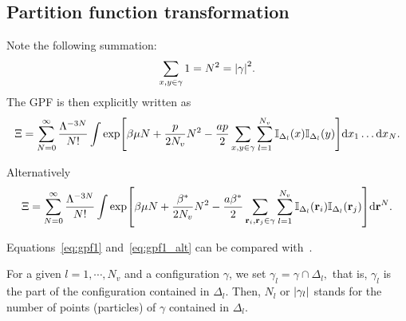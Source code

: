 \documentclass[12pt]{article}
\numberwithin{equation}{section}
\begin{document}
	\subsection{Partition function transformation}
	Note the following summation:
	\begin{equation}
		\sum_{x,y \in \gamma} 1 = N^2 = \abs{\gamma}^2.
	\end{equation}
	The GPF is then explicitly written as
	\begin{equation}
		\label{eq:gpf1}
		\Xi = \sum_{N=0}^{\infty} \frac{\Lambda^{-3N}}{N!}\int \exp[\beta\mu N + \frac{p}{2N_{v}} N^2 - \frac{ap}{2} \sum_{x,y \in \gamma} \sum_{l=1}^{N_v} \mathbb{I}_{\Delta_l}(x)\mathbb{I}_{\Delta_l}(y)] {\rm d} x_1 \dotsc {\rm d} x_N.
	\end{equation}
	
	\begin{mdframed}[linecolor=black,linewidth=1pt,leftline=true]
	Alternatively
		\begin{equation}
			\label{eq:gpf1_alt}
			\Xi = \sum_{N=0}^{\infty} \frac{\Lambda^{-3N}}{N!}
			\int
			\exp[\beta\mu N + \frac{\beta^*}{2N_{v}} N^2 - \frac{a\beta^*}{2} \sum_{\vb{r}_i,\vb{r}_j \in \gamma} \sum_{l=1}^{N_v} \mathbb{I}_{\Delta_l}(\vb{r}_i)\mathbb{I}_{\Delta_l}(\vb{r}_j)] {\rm d} \vb{r}^N.
		\end{equation}
	\end{mdframed}
	Equations~\eqref{eq:gpf1} and~\eqref{eq:gpf1_alt} can be compared with~\cite[(2.5)]{KKD20}.
	
	For a given $l = 1, \cdots , N_v$ and a configuration $\gamma$, we set $\gamma_l = \gamma \cap \Delta_l,$ that is, $\gamma_l$ is the part of the configuration contained in $\Delta_l$. Then, $N_l$ or $\abs{\gamma_l}$ stands for the number of points (particles) of $\gamma$ contained in $\Delta_l$.
	
\end{document}
